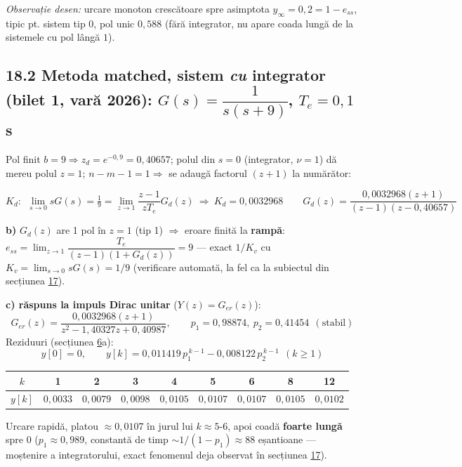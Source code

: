 \documentclass[10pt,a4paper]{article}
\begin{document}
\begin{center}
\end{center}
\textit{Observație desen:} urcare monoton crescătoare spre asimptota $y_\infty{=}0{,}2{=}1-e_{ss}$, tipic pt. sistem tip 0, pol unic $0{,}588$ (fără integrator, nu apare coada lungă de la sistemele cu pol lângă $1$).

\subsection*{18.2 Metoda matched, sistem \emph{cu} integrator (bilet 1, vară 2026): $G(s)=\dfrac1{s(s+9)}$, $T_e{=}0{,}1$s}
Pol finit $b{=}9\Rightarrow z_d=e^{-0,9}=0{,}40657$; polul din $s{=}0$ (integrator, $\nu{=}1$) dă mereu polul $z{=}1$; $n{-}m{-}1{=}1\Rightarrow$ se adaugă factorul $(z+1)$ la numărător:
\begin{keyeq}\color{red!65!black}
$$K_d:\ \ \lim_{s\to0}sG(s)=\tfrac19=\lim_{z\to1}\dfrac{z-1}{zT_e}G_d(z)\ \Rightarrow\ K_d=0{,}0032968\qquad G_d(z)=\dfrac{0{,}0032968(z+1)}{(z-1)(z-0{,}40657)}$$
\end{keyeq}
\textbf{b)} $G_d(z)$ are 1 pol în $z{=}1$ (tip 1) $\Rightarrow$ eroare finită la \textbf{rampă}: $e_{ss}=\lim_{z\to1}\dfrac{T_e}{(z-1)(1+G_d(z))}=9$ — exact $1/K_v$ cu $K_v{=}\lim_{s\to0}sG(s){=}1/9$ (verificare automată, la fel ca la subiectul din secțiunea \hyperref[sec:17]{17}).

\textbf{c) răspuns la impuls Dirac unitar} ($Y(z)=G_{er}(z)$):
$$G_{er}(z)=\dfrac{0{,}0032968(z+1)}{z^2-1{,}40327z+0{,}40987},\qquad p_1{=}0{,}98874,\ p_2{=}0{,}41454\ \ (\text{stabil})$$
Reziduuri (secțiunea \hyperref[sec:6]{6}a):
$$y[0]=0,\qquad y[k]=0{,}011419\,p_1^{\,k-1}-0{,}008122\,p_2^{\,k-1}\ \ (k\ge1)$$
\begin{center}\small
\begin{tabular}{c|cccccccc}
$k$ & 1 & 2 & 3 & 4 & 5 & 6 & 8 & 12\\\hline
$y[k]$ & $0{,}0033$ & $0{,}0079$ & $0{,}0098$ & $0{,}0105$ & $0{,}0107$ & $0{,}0107$ & $0{,}0105$ & $0{,}0102$
\end{tabular}
\end{center}
Urcare rapidă, platou $\approx0{,}0107$ în jurul lui $k{\approx}5$-$6$, apoi coadă \textbf{foarte lungă} spre $0$ ($p_1{\approx}0{,}989$, constantă de timp $\sim1/(1{-}p_1)\approx88$ eșantioane — moștenire a integratorului, exact fenomenul deja observat în secțiunea \hyperref[sec:17]{17}).
\end{document}
